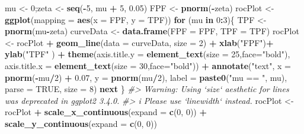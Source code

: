 \documentclass[
]{book}
\newenvironment{Shaded}{\begin{snugshade}}{\end{snugshade}}
\newcommand{\CommentTok}[1]{\textcolor[rgb]{0.56,0.35,0.01}{\textit{#1}}}
\newcommand{\ControlFlowTok}[1]{\textcolor[rgb]{0.13,0.29,0.53}{\textbf{#1}}}
\newcommand{\DataTypeTok}[1]{\textcolor[rgb]{0.13,0.29,0.53}{#1}}
\newcommand{\DecValTok}[1]{\textcolor[rgb]{0.00,0.00,0.81}{#1}}
\newcommand{\FloatTok}[1]{\textcolor[rgb]{0.00,0.00,0.81}{#1}}
\newcommand{\KeywordTok}[1]{\textcolor[rgb]{0.13,0.29,0.53}{\textbf{#1}}}
\newcommand{\NormalTok}[1]{#1}
\newcommand{\OperatorTok}[1]{\textcolor[rgb]{0.81,0.36,0.00}{\textbf{#1}}}
\newcommand{\OtherTok}[1]{\textcolor[rgb]{0.56,0.35,0.01}{#1}}
\newcommand{\StringTok}[1]{\textcolor[rgb]{0.31,0.60,0.02}{#1}}
\begin{document}
\begin{Shaded}
\begin{Highlighting}[]
\NormalTok{mu <-}\StringTok{ }\DecValTok{0}\NormalTok{;zeta <-}\StringTok{ }\KeywordTok{seq}\NormalTok{(}\OperatorTok{-}\DecValTok{5}\NormalTok{, mu }\OperatorTok{+}\StringTok{ }\DecValTok{5}\NormalTok{, }\FloatTok{0.05}\NormalTok{)}
\NormalTok{FPF <-}\StringTok{ }\KeywordTok{pnorm}\NormalTok{(}\OperatorTok{-}\NormalTok{zeta)}
\NormalTok{rocPlot <-}\StringTok{ }\KeywordTok{ggplot}\NormalTok{(}\DataTypeTok{mapping =} \KeywordTok{aes}\NormalTok{(}\DataTypeTok{x =}\NormalTok{ FPF, }\DataTypeTok{y =}\NormalTok{ TPF))}
\ControlFlowTok{for}\NormalTok{ (mu }\ControlFlowTok{in} \DecValTok{0}\OperatorTok{:}\DecValTok{3}\NormalTok{)\{}
\NormalTok{  TPF <-}\StringTok{ }\KeywordTok{pnorm}\NormalTok{(mu}\OperatorTok{-}\NormalTok{zeta)}
\NormalTok{  curveData <-}\StringTok{ }\KeywordTok{data.frame}\NormalTok{(}\DataTypeTok{FPF =}\NormalTok{ FPF, }\DataTypeTok{TPF =}\NormalTok{ TPF)}
\NormalTok{  rocPlot <-}\StringTok{ }\NormalTok{rocPlot }\OperatorTok{+}\StringTok{ }
\StringTok{    }\KeywordTok{geom_line}\NormalTok{(}\DataTypeTok{data =}\NormalTok{ curveData, }\DataTypeTok{size =} \DecValTok{2}\NormalTok{) }\OperatorTok{+}\StringTok{ }
\StringTok{    }\KeywordTok{xlab}\NormalTok{(}\StringTok{"FPF"}\NormalTok{)}\OperatorTok{+}\StringTok{ }\KeywordTok{ylab}\NormalTok{(}\StringTok{"TPF"}\NormalTok{ ) }\OperatorTok{+}\StringTok{ }
\StringTok{    }\KeywordTok{theme}\NormalTok{(}\DataTypeTok{axis.title.y =} \KeywordTok{element_text}\NormalTok{(}\DataTypeTok{size =} \DecValTok{25}\NormalTok{,}\DataTypeTok{face=}\StringTok{"bold"}\NormalTok{),}
          \DataTypeTok{axis.title.x =} \KeywordTok{element_text}\NormalTok{(}\DataTypeTok{size =} \DecValTok{30}\NormalTok{,}\DataTypeTok{face=}\StringTok{"bold"}\NormalTok{))  }\OperatorTok{+}
\StringTok{    }\KeywordTok{annotate}\NormalTok{(}\StringTok{"text"}\NormalTok{, }
             \DataTypeTok{x =} \KeywordTok{pnorm}\NormalTok{(}\OperatorTok{-}\NormalTok{mu}\OperatorTok{/}\DecValTok{2}\NormalTok{) }\OperatorTok{+}\StringTok{ }\FloatTok{0.07}\NormalTok{, }
             \DataTypeTok{y =} \KeywordTok{pnorm}\NormalTok{(mu}\OperatorTok{/}\DecValTok{2}\NormalTok{), }
             \DataTypeTok{label =} \KeywordTok{paste0}\NormalTok{(}\StringTok{"mu == "}\NormalTok{, mu), }
             \DataTypeTok{parse =} \OtherTok{TRUE}\NormalTok{, }\DataTypeTok{size =} \DecValTok{8}\NormalTok{)}
  \ControlFlowTok{next}
\NormalTok{\}}
\CommentTok{#> Warning: Using `size` aesthetic for lines was deprecated in ggplot2 3.4.0.}
\CommentTok{#> i Please use `linewidth` instead.}
\NormalTok{rocPlot <-}\StringTok{ }\NormalTok{rocPlot }\OperatorTok{+}
\StringTok{  }\KeywordTok{scale_x_continuous}\NormalTok{(}\DataTypeTok{expand =} \KeywordTok{c}\NormalTok{(}\DecValTok{0}\NormalTok{, }\DecValTok{0}\NormalTok{)) }\OperatorTok{+}\StringTok{ }
\StringTok{  }\KeywordTok{scale_y_continuous}\NormalTok{(}\DataTypeTok{expand =} \KeywordTok{c}\NormalTok{(}\DecValTok{0}\NormalTok{, }\DecValTok{0}\NormalTok{))     }


\end{Highlighting}
\end{Shaded}
\end{document}
